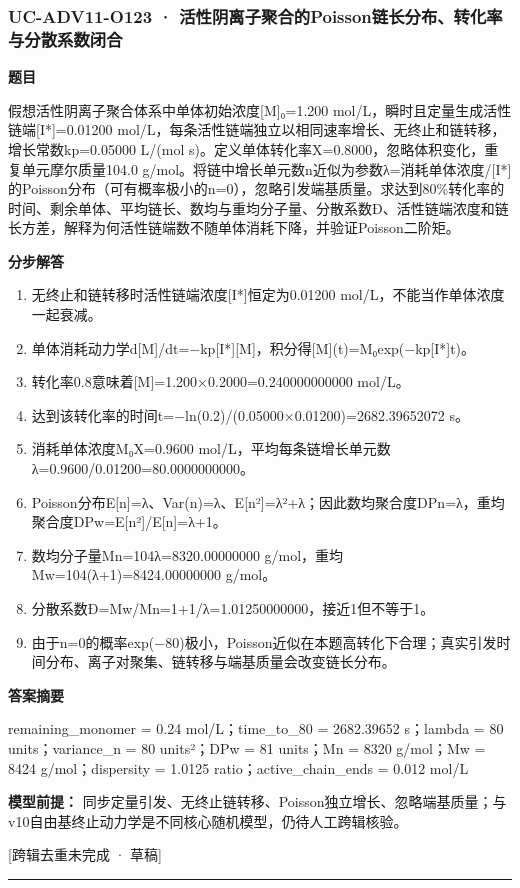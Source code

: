 \documentclass[UTF8,11pt,a4paper]{ctexart}
\begin{document}
\subsubsection*{UC-ADV11-O123 · 活性阴离子聚合的Poisson链长分布、转化率与分散系数闭合}
\noindent\textbf{题目}\par
假想活性阴离子聚合体系中单体初始浓度[M]₀=1.200 mol/L，瞬时且定量生成活性链端[I*]=0.01200 mol/L，每条活性链端独立以相同速率增长、无终止和链转移，增长常数kp=0.05000 L/(mol s)。定义单体转化率X=0.8000，忽略体积变化，重复单元摩尔质量104.0 g/mol。将链中增长单元数n近似为参数λ=消耗单体浓度/[I*]的Poisson分布（可有概率极小的n=0），忽略引发端基质量。求达到80\%转化率的时间、剩余单体、平均链长、数均与重均分子量、分散系数Đ、活性链端浓度和链长方差，解释为何活性链端数不随单体消耗下降，并验证Poisson二阶矩。\par
\medskip\noindent\textbf{分步解答}
\begin{enumerate}
\item 无终止和链转移时活性链端浓度[I*]恒定为0.01200 mol/L，不能当作单体浓度一起衰减。
\item 单体消耗动力学d[M]/dt=−kp[I*][M]，积分得[M](t)=M₀exp(−kp[I*]t)。
\item 转化率0.8意味着[M]=1.200×0.2000=0.240000000000 mol/L。
\item 达到该转化率的时间t=−ln(0.2)/(0.05000×0.01200)=2682.39652072 s。
\item 消耗单体浓度M₀X=0.9600 mol/L，平均每条链增长单元数λ=0.9600/0.01200=80.0000000000。
\item Poisson分布E[n]=λ、Var(n)=λ、E[n²]=λ²+λ；因此数均聚合度DPn=λ，重均聚合度DPw=E[n²]/E[n]=λ+1。
\item 数均分子量Mn=104λ=8320.00000000 g/mol，重均Mw=104(λ+1)=8424.00000000 g/mol。
\item 分散系数Đ=Mw/Mn=1+1/λ=1.01250000000，接近1但不等于1。
\item 由于n=0的概率exp(−80)极小，Poisson近似在本题高转化下合理；真实引发时间分布、离子对聚集、链转移与端基质量会改变链长分布。
\end{enumerate}
\noindent\textbf{答案摘要}\par
remaining\_monomer = 0.24 mol/L；time\_to\_80 = 2682.39652 s；lambda = 80 units；variance\_n = 80 units²；DPw = 81 units；Mn = 8320 g/mol；Mw = 8424 g/mol；dispersity = 1.0125 ratio；active\_chain\_ends = 0.012 mol/L\par
\noindent\textbf{模型前提：}
同步定量引发、无终止链转移、Poisson独立增长、忽略端基质量；与v10自由基终止动力学是不同核心随机模型，仍待人工跨辑核验。\par
\noindent\textcolor{red!65!black}{[跨辑去重未完成 · 草稿]} \par
\medskip\hrule\medskip
{}
\end{document}
